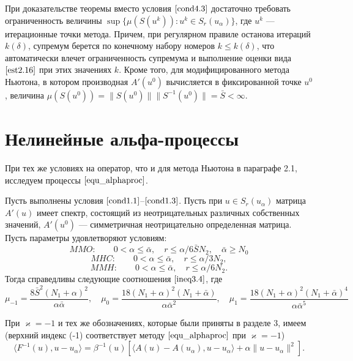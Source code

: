 {\remark При доказательстве теоремы вместо условия  $\eqref{cond4.3}$ достаточно требовать ограниченность величины $\sup\{\mu(S(u^k)): u^k \in S_r(u_\alpha)\}$, где $u^k$ --- итерационные точки метода. Причем, при регулярном правиле останова итераций $k(\delta)$, супремум берется по конечному набору номеров $k\le k(\delta)$, что автоматически влечет ограниченность супремума и выполнение оценки вида $\eqref{est2.16}$ при этих значениях $k$. Кроме того, для модифицированного метода Ньютона, в котором производная $A'(u^0)$ вычисляется в фиксированной точке $u^0$, величина $\mu(S(u^0))=\|S(u^0)\|\|S^{-1}(u^0)\|=\bar S<\infty$.}

\newpage
\section{Нелинейные альфа-процессы}
При тех же условиях на оператор, что и для метода Ньютона в параграфе 2.1, исследуем процессы $\eqref{equ_alphaproc}$.
\begin{theorem}\label{teo4.2}
	Пусть выполнены условия $\eqref{cond1.1}$--$\eqref{cond1.3}$. Пусть при $u \in S_r(u_\alpha)$ матрица $A'(u)$ имеет спектр, состоящий из неотрицательных различных собственных значений, $A'(u^0)$ --- симметричная неотрицательно определенная матрица. Пусть параметры удовлетворяют условиям: 
	\begin{equation}\label{cond4.4}
	MMO:\qquad 0<\alpha\le\bar\alpha, \quad r\le\alpha /6\bar SN_2, \quad \bar\alpha \ge N_0
	\end{equation}
	\begin{equation}\label{cond4.5}
	MHC:\qquad 0<\alpha\le\bar\alpha, \quad r\le\alpha /3N_2,
	\end{equation}
	\begin{equation}\label{cond4.6}
	MMH:\qquad 0<\alpha\le\bar\alpha, \quad r\le\alpha /6N_2.
	\end{equation}
	Тогда справедливы следующие соотношения  $\eqref{ineq3.4}$, где
	\begin{equation}\label{eq4.7}
	\mu _{-1}=\frac{8\bar S^2(N_1+\alpha)^2}{\alpha\bar\alpha}, \quad \mu _0=\frac{18(N_1+\alpha)^2(N_1+\bar\alpha)}{\alpha\bar\alpha ^2}, \quad \mu _1=\frac{18(N_1+\alpha)^2(N_1+\bar\alpha)^4}{\alpha\bar\alpha ^5}
	\end{equation}
\end{theorem}
\proof При $\varkappa=-1$ и тех же обозначениях, которые были приняты в разделе 3, имеем (верхний индекс (-1) соответствует методу $\eqref{equ_alphaproc}$ при $\varkappa=-1$)
$$\langle F^{-1}(u), u-u_\alpha\rangle=\beta ^{-1}(u)[\langle A(u)-A(u_\alpha), u-u_\alpha\rangle+\alpha\|u-u_\alpha\|^2].$$
